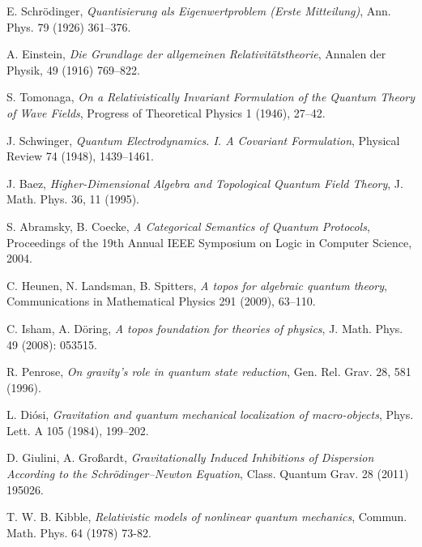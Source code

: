 \documentclass[12pt]{article}
\begin{document}
\begin{thebibliography}{99}
E. Schr\"odinger, \textit{Quantisierung als Eigenwertproblem (Erste Mitteilung)}, Ann. Phys. 79 (1926) 361–376.

A. Einstein, \textit{Die Grundlage der allgemeinen Relativit\"atstheorie}, Annalen der Physik, 49 (1916) 769–822.

S. Tomonaga, \textit{On a Relativistically Invariant Formulation of the Quantum Theory of Wave Fields}, Progress of Theoretical Physics 1 (1946), 27–42.

J. Schwinger, \textit{Quantum Electrodynamics. I. A Covariant Formulation}, Physical Review 74 (1948), 1439–1461.

J. Baez, \textit{Higher-Dimensional Algebra and Topological Quantum Field Theory}, J. Math. Phys. 36, 11 (1995).

S. Abramsky, B. Coecke, \textit{A Categorical Semantics of Quantum Protocols}, Proceedings of the 19th Annual IEEE Symposium on Logic in Computer Science, 2004.

C. Heunen, N. Landsman, B. Spitters, \textit{A topos for algebraic quantum theory}, Communications in Mathematical Physics 291 (2009), 63–110.

C. Isham, A. D\"oring, \textit{A topos foundation for theories of physics}, J. Math. Phys. 49 (2008): 053515.

R. Penrose, \textit{On gravity's role in quantum state reduction}, Gen. Rel. Grav. 28, 581 (1996).

L. Di\'osi, \textit{Gravitation and quantum mechanical localization of macro-objects}, Phys. Lett. A 105 (1984), 199–202.

D. Giulini, A. Gro{\ss}ardt, \textit{Gravitationally Induced Inhibitions of Dispersion According to the Schr\"odinger–Newton Equation}, Class. Quantum Grav. 28 (2011) 195026.

T. W. B. Kibble, \textit{Relativistic models of nonlinear quantum mechanics}, Commun. Math. Phys. 64 (1978) 73-82.

\end{thebibliography}
\end{document}
